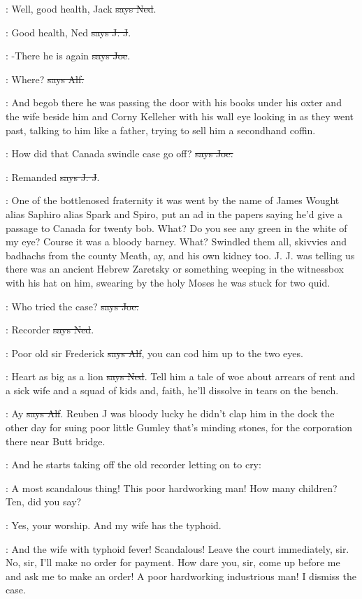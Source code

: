 \lambert:
Well, good health, Jack \sout{says Ned}.

\jjom:
Good health, Ned \sout{says J. J}.

\joe:
-There he is again \sout{says Joe}.

\bergan:
Where? \sout{says Alf.}

\Nq:
And begob there he was passing the door with his books under his
oxter and the wife beside him and Corny Kelleher with his wall eye looking
in as they went past, talking to him like a father, trying to sell him a
secondhand coffin.

\joe:
How did that Canada swindle case go off? \sout{says Joe.}

\jjom:
Remanded \sout{says J. J}.

\Nq:
One of the bottlenosed fraternity it was went by the name of James
Wought alias Saphiro alias Spark and Spiro, put an ad in the papers saying
he'd give a passage to Canada for twenty bob. What? Do you see any green
in the white of my eye? Course it was a bloody barney. What? Swindled
them all, skivvies and badhachs from the county Meath, ay, and his own
kidney too. J. J. was telling us there was an ancient Hebrew Zaretsky or
something weeping in the witnessbox with his hat on him, swearing by the
holy Moses he was stuck for two quid.

\joe:
Who tried the case? \sout{says Joe.}

\lambert:
Recorder \sout{says Ned}.

\bergan:
Poor old sir Frederick \sout{says Alf},
you can cod him up to the two eyes.

\lambert:
Heart as big as a lion \sout{says Ned}.
Tell him a tale of woe about arrears
of rent and a sick wife and a squad of kids and, faith, he'll dissolve in
tears on the bench.

\bergan:
Ay \sout{says Alf}.
Reuben J was bloody lucky he didn't clap him in the dock
the other day for suing poor little Gumley that's minding stones, for the
corporation there near Butt bridge.

\Nq:
And he starts taking off the old recorder letting on to cry:

\bergan:
A most scandalous thing! This poor hardworking man! How many
children? Ten, did you say?

\bergan:
Yes, your worship. And my wife has the typhoid.

\bergan:
And the wife with typhoid fever! Scandalous! Leave the court
immediately, sir. No, sir, I'll make no order for payment. How dare you,
sir, come up before me and ask me to make an order! A poor hardworking
industrious man! I dismiss the case.

